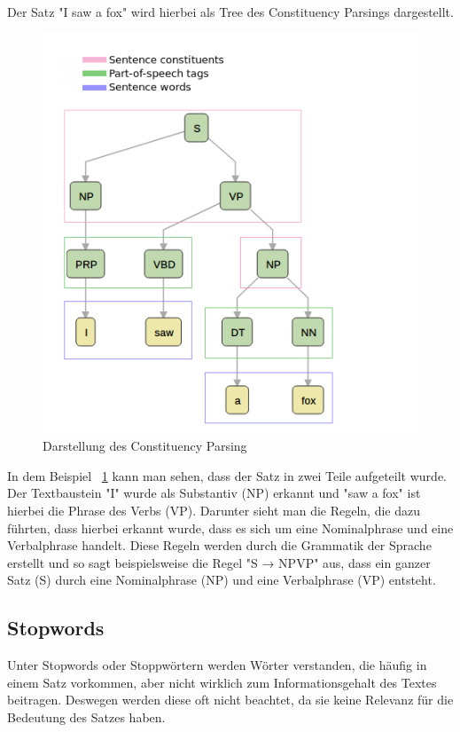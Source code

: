 Der Satz "I saw a fox" wird hierbei als Tree des Constituency Parsings dargestellt.

\begin{figure}[hbt!]
    \centering
    \includegraphics[scale=0.5]{pics/constituency_parse_tree}
    \caption{Darstellung des Constituency Parsing~\cite{dependencyVsConstituencyParsing}}
    \label{fig:constituency_parsing_tree}
\end{figure}

In dem Beispiel ~\ref{fig:constituency_parsing_tree} kann man sehen, dass der Satz in zwei Teile aufgeteilt wurde.
Der Textbaustein "I" wurde als Substantiv (NP) erkannt und "saw a fox" ist hierbei die Phrase des Verbs (VP).
Darunter sieht man die Regeln, die dazu führten, dass hierbei erkannt wurde, dass es sich um eine Nominalphrase und eine Verbalphrase handelt.
Diese Regeln werden durch die Grammatik der Sprache erstellt und so sagt beispielsweise die Regel "S → NPVP" aus, dass ein ganzer Satz (S) durch eine Nominalphrase (NP) und eine Verbalphrase (VP) entsteht.\cite{dependencyVsConstituencyParsing}

\subsection{Stopwords}

Unter Stopwords oder Stoppwörtern werden Wörter verstanden, die häufig in einem Satz vorkommen, aber nicht wirklich zum Informationsgehalt des Textes beitragen.
Deswegen werden diese oft nicht beachtet, da sie keine Relevanz für die Bedeutung des Satzes haben.


